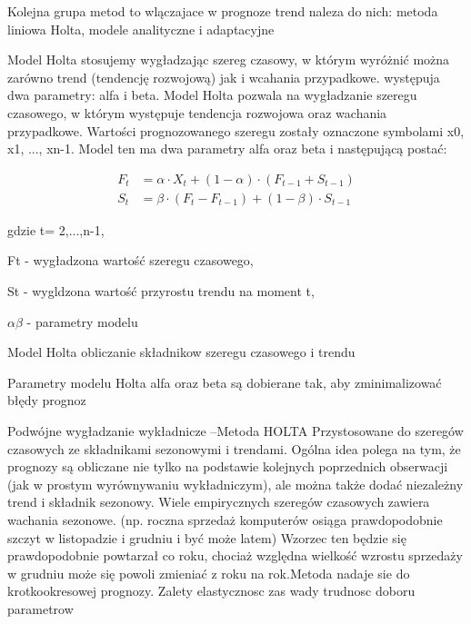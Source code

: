 Kolejna grupa metod to wlączajace w prognoze trend naleza do nich:  metoda liniowa Holta, modele analityczne i adaptacyjne


\vspace{\baselineskip}
Model Holta stosujemy wygładzając szereg czasowy, w którym wyróżnić można zarówno trend (tendencję rozwojową) jak i wcahania przypadkowe.  występuja dwa parametry: alfa i beta.\cite{hol2023}
 \vspace{\baselineskip}
Model Holta pozwala na wygładzanie szeregu czasowego, w którym występuje tendencja rozwojowa oraz wachania przypadkowe. Wartości prognozowanego szeregu zostały oznaczone symbolami x0, x1, ..., xn-1. Model ten ma dwa parametry alfa oraz beta i następującą postać:

\begin{align*}
F_t & = \alpha\cdot X_t + (1 - \alpha)\cdot (F_{t-1} + S_{t-1}) \\
S_t & = \beta\cdot (F_t - F_{t-1}) + (1 - \beta)\cdot S_{t-1}
\end{align*}

gdzie t= 2,...,n-1,

Ft - wygładzona wartość szeregu czasowego,

St - wygldzona wartość przyrostu trendu na moment t,

\(\alpha \beta\) - parametry modelu

Model Holta  obliczanie składnikow szeregu czasowego i trendu\cite{szos2012}





Parametry modelu Holta alfa oraz beta są dobierane tak, aby zminimalizować błędy prognoz\cite{szos2012}

Podwójne wygładzanie wykładnicze –Metoda HOLTA Przystosowane do szeregów czasowych ze składnikami 
sezonowymi i trendami.  Ogólna idea polega na tym, że prognozy są obliczane nie tylko 
na podstawie kolejnych poprzednich obserwacji (jak w prostym  wyrównywaniu wykładniczym), ale można także dodać niezależny trend i składnik sezonowy. 
 Wiele empirycznych szeregów czasowych zawiera wachania sezonowe. (np. roczna sprzedaż komputerów osiąga prawdopodobnie szczyt w listopadzie i grudniu i być może latem) Wzorzec ten będzie się prawdopodobnie powtarzał co roku, chociaż względna wielkość wzrostu sprzedaży w grudniu może się powoli zmieniać z roku na rok.Metoda nadaje sie do krotkookresowej prognozy. Zalety elastycznosc zas  wady trudnosc doboru parametrow\cite{szer2009}





